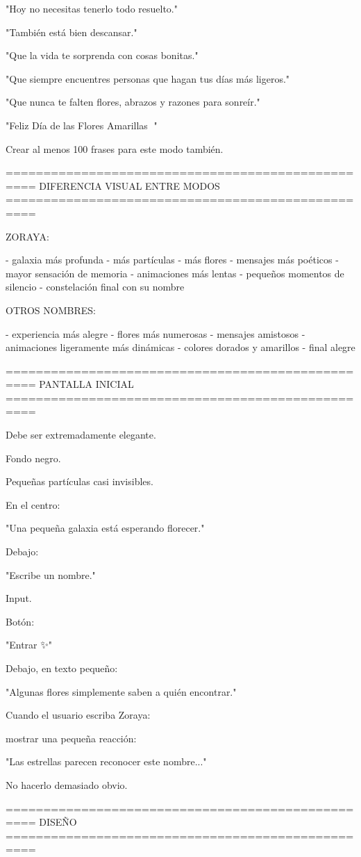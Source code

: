 "Hoy no necesitas tenerlo todo resuelto."

"También está bien descansar."

"Que la vida te sorprenda con cosas bonitas."

"Que siempre encuentres personas que hagan tus días más ligeros."

"Que nunca te falten flores, abrazos y razones para sonreír."

"Feliz Día de las Flores Amarillas 🌻"

Crear al menos 100 frases para este modo también.

==================================================
DIFERENCIA VISUAL ENTRE MODOS
==================================================

ZORAYA:

- galaxia más profunda
- más partículas
- más flores
- mensajes más poéticos
- mayor sensación de memoria
- animaciones más lentas
- pequeños momentos de silencio
- constelación final con su nombre

OTROS NOMBRES:

- experiencia más alegre
- flores más numerosas
- mensajes amistosos
- animaciones ligeramente más dinámicas
- colores dorados y amarillos
- final alegre

==================================================
PANTALLA INICIAL
==================================================

Debe ser extremadamente elegante.

Fondo negro.

Pequeñas partículas casi invisibles.

En el centro:

"Una pequeña galaxia está esperando florecer."

Debajo:

"Escribe un nombre."

Input.

Botón:

"Entrar ✨"

Debajo, en texto pequeño:

"Algunas flores simplemente saben a quién encontrar."

Cuando el usuario escriba Zoraya:

mostrar una pequeña reacción:

"Las estrellas parecen reconocer este nombre..."

No hacerlo demasiado obvio.

==================================================
DISEÑO
==================================================

